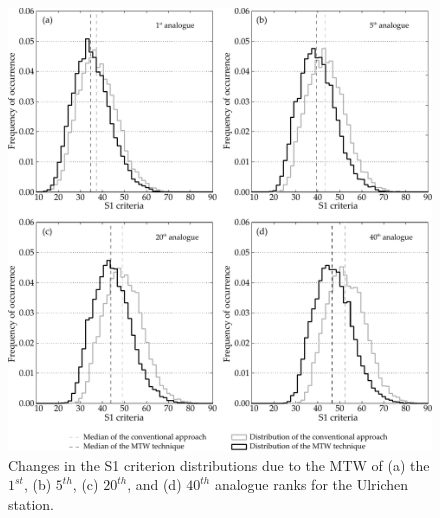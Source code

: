 \documentclass[hess, manuscript]{copernicus}
\begin{document}
	\begin{figure}[htb]
		\begin{center}
			\includegraphics[width=15cm]{figures/changes_S1_analogues.pdf}
		\end{center}
		\caption{Changes in the S1 criterion distributions due to the MTW of (a) the $1^{st}$, (b) $5^{th}$, (c) $20^{th}$, and (d) $40^{th}$ analogue ranks for the Ulrichen station.}
		\label{fig:changes_S1_analogs}
	\end{figure}
	
\end{document}

